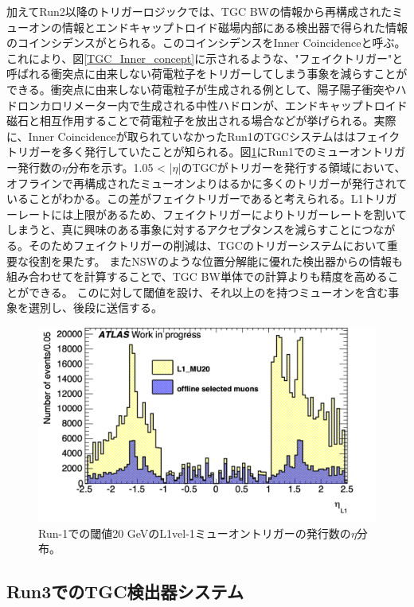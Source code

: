 加えてRun2以降のトリガーロジックでは、TGC BWの情報から再構成されたミューオンの情報とエンドキャップトロイド磁場内部にある検出器で得られた情報のコインシデンスがとられる。このコインシデンスをInner Coincidenceと呼ぶ。これにより、図\ref{TGC_Inner_concept}に示されるような、"フェイクトリガー"と呼ばれる衝突点に由来しない荷電粒子をトリガーしてしまう事象を減らすことができる。衝突点に由来しない荷電粒子が生成される例として、陽子陽子衝突やハドロンカロリメーター内で生成される中性ハドロンが、エンドキャップトロイド磁石と相互作用することで荷電粒子を放出される場合などが挙げられる。実際に、Inner Coincidenceが取られていなかったRun1のTGCシステムははフェイクトリガーを多く発行していたことが知られる。図\ref{TGC_faketrigger}にRun1でのミューオントリガー発行数の$\eta$分布を示す。1.05 < |$\eta$|のTGCがトリガーを発行する領域において、オフラインで再構成されたミューオンよりはるかに多くのトリガーが発行されていることがわかる。この差がフェイクトリガーであると考えられる。L1トリガーレートには上限があるため、フェイクトリガーによりトリガーレートを割いてしまうと、真に興味のある事象に対するアクセプタンスを減らすことにつながる。そのためフェイクトリガーの削減は、TGCのトリガーシステムにおいて重要な役割を果たす。
またNSWのような位置分解能に優れた検出器からの情報も組み合わせて\pt を計算することで、TGC BW単体での計算よりも精度を高めることができる。
この\pt に対して閾値を設け、それ以上の\pt を持つミューオンを含む事象を選別し、後段に送信する。

\begin{figure} 
\centering
\includegraphics[width=16cm]{fig/Intro/TGC_faketrigger.png}
\caption[Run-1での\pt 閾値]{Run-1での\pt 閾値20 GeVのL1vel-1ミューオントリガーの発行数の$\eta$分布。}
\label{TGC_faketrigger}
\end{figure}



    \subsection{Run3でのTGC検出器システム}

